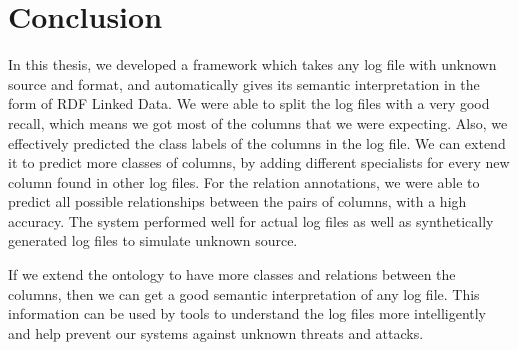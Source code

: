 \chapter{Conclusion}
\thispagestyle{plain}

\label{Conclusion}

In this thesis, we developed a framework which takes any log file with unknown source and format, and automatically gives its semantic interpretation in the form of RDF Linked Data. We were able to split the log files with a very good recall, which means we got most of the columns that we were expecting. Also, we  effectively predicted the class labels of the columns in the log file. We can extend it to predict more classes of columns, by adding different specialists for every new column found in other log files. For the relation annotations, we were able to predict all possible relationships between the pairs of columns, with a high accuracy. The system performed well for actual log files as well as synthetically generated log files to simulate unknown source.

If we extend the ontology to have more classes and relations between the columns, then we can get a good semantic interpretation of any log file. This information can be used by tools to understand the log files more intelligently and help prevent our systems against unknown threats and attacks.
